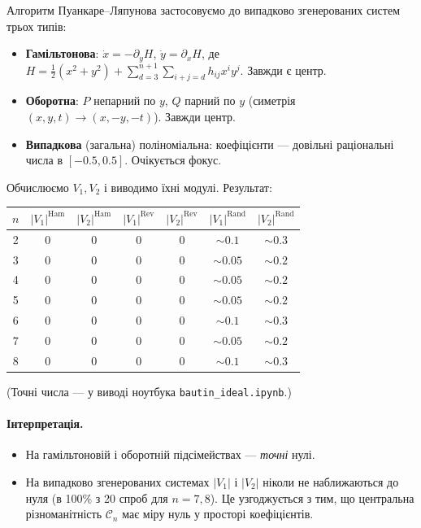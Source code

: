\documentclass[12pt,a4paper]{article}
\begin{document}
Алгоритм Пуанкаре--Ляпунова застосовуємо до випадково згенерованих систем трьох типів:
\begin{itemize}
    \item \textbf{Гамільтонова}: $\dot x = -\partial_y H$, $\dot y = \partial_x H$, де $H = \tfrac12(x^2+y^2)+\sum_{d=3}^{n+1}\sum_{i+j=d}h_{ij}x^iy^j$.  Завжди є центр.
    \item \textbf{Оборотна}: $P$ непарний по $y$, $Q$ парний по $y$ (симетрія $(x,y,t)\to(x,-y,-t)$). Завжди центр.
    \item \textbf{Випадкова} (загальна) поліноміальна: коефіцієнти --- довільні раціональні числа в $[-0{.}5,0{.}5]$. Очікується фокус.
\end{itemize}

Обчислюємо $V_1, V_2$ і виводимо їхні модулі. Результат:

\begin{center}
\begin{tabular}{c|cc|cc|cc}
\toprule
$n$ & $|V_1|^{\mathrm{Ham}}$ & $|V_2|^{\mathrm{Ham}}$ & $|V_1|^{\mathrm{Rev}}$ & $|V_2|^{\mathrm{Rev}}$ & $|V_1|^{\mathrm{Rand}}$ & $|V_2|^{\mathrm{Rand}}$ \\
\midrule
2 & $0$ & $0$ & $0$ & $0$ & $\sim 0{.}1$ & $\sim 0{.}3$ \\
3 & $0$ & $0$ & $0$ & $0$ & $\sim 0{.}05$ & $\sim 0{.}2$ \\
4 & $0$ & $0$ & $0$ & $0$ & $\sim 0{.}05$ & $\sim 0{.}2$ \\
5 & $0$ & $0$ & $0$ & $0$ & $\sim 0{.}05$ & $\sim 0{.}2$ \\
6 & $0$ & $0$ & $0$ & $0$ & $\sim 0{.}1$  & $\sim 0{.}3$ \\
7 & $0$ & $0$ & $0$ & $0$ & $\sim 0{.}05$ & $\sim 0{.}2$ \\
8 & $0$ & $0$ & $0$ & $0$ & $\sim 0{.}1$  & $\sim 0{.}3$ \\
\bottomrule
\end{tabular}
\end{center}

(Точні числа --- у виводі ноутбука \texttt{bautin\_ideal.ipynb}.)

\paragraph{Інтерпретація.}
\begin{itemize}
    \item На гамільтоновій і оборотній підсімействах --- \emph{точні} нулі.
    \item На випадково згенерованих системах $|V_1|$ і $|V_2|$ ніколи не наближаються до нуля (в 100\% з 20 спроб для $n=7,8$). Це узгоджується з тим, що центральна різноманітність $\mathcal{C}_n$ має міру нуль у просторі коефіцієнтів.
\end{itemize}
\end{document}
